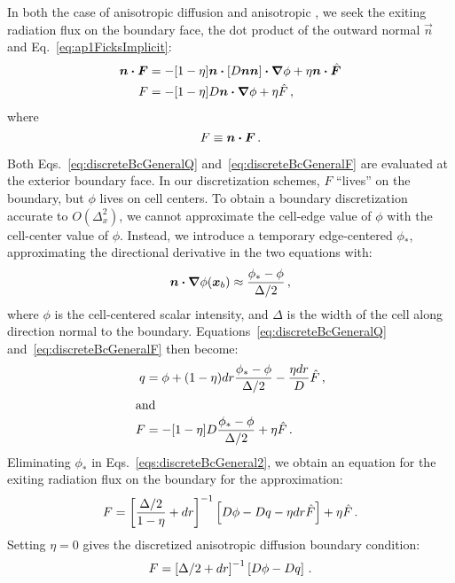 In both the case of anisotropic diffusion and anisotropic \Pone, we seek the
exiting radiation flux on the boundary face, the dot
product of the outward normal $\vec{n}$ and Eq.~\eqref{eq:ap1FicksImplicit}:
\begin{align}\nonumber
  \bm{n} \bm{\cdot}\bm{F}
  &= - [1 - \eta]\bm{n} \bm{\cdot} \left[ D \bm{n} \bm{n}  \right] \bm{\cdot} \bm{\nabla} \phi
  + \eta \bm{n} \bm{\cdot}\hat{\bm{F}}
  \\ \label{eq:discreteBcGeneralF}
  F &= - [1 - \eta] D \bm{n} \bm{\cdot} \bm{\nabla} \phi + \eta \hat{F} \,,
\end{align}
where
\begin{equation*}
  F \equiv \bm{n} \bm{\cdot} \bm{F} \,.
\end{equation*}

Both Eqs.~\eqref{eq:discreteBcGeneralQ} and~\eqref{eq:discreteBcGeneralF}
are evaluated at the exterior boundary face.  In our discretization schemes, 
$F$ ``lives'' on the boundary, but $\phi$ lives on cell centers. To obtain a
boundary discretization accurate to $O(\Delta_x^2)$, we cannot approximate the
cell-edge value of $\phi$ with the cell-center value of $\phi$. Instead, we
introduce a temporary edge-centered $\phi_*$, approximating the directional
derivative in the two equations with:
\begin{equation*}
  \bm{n} \bm{\cdot} \bm{\nabla} \phi(\bm{x}_b) \approx \frac{\phi_* - \phi}{\Delta/2}\,,
\end{equation*}
where $\phi$ is the cell-centered scalar intensity, and $\Delta$ is the width of
the cell along direction normal to the boundary. Equations~\eqref{eq:discreteBcGeneralQ}
and~\eqref{eq:discreteBcGeneralF} then become:
\begin{subequations}\label{eqs:discreteBcGeneral2}
  \begin{align}\label{eq:discreteBcGeneralQ2}
 q &=  \phi + (1 - \eta) dr \frac{\phi_* - \phi}{\Delta/2}
  - \frac{\eta dr}{D} \hat{F} \,,
  \\ 
  \intertext{and} \label{eq:discreteBcGeneralF2}
  F &= - [1 - \eta] D\frac{\phi_* - \phi}{\Delta/2} + \eta \hat{F} \,.
  \end{align}
\end{subequations}
Eliminating $\phi_*$ in Eqs.~\eqref{eqs:discreteBcGeneral2},
we obtain an equation for the exiting
radiation flux on the boundary for the \APone approximation:
\begin{equation}\label{eq:discreteBcAponeFinal}
  F = \left[ \frac{\Delta/2}{1 - \eta} + dr \right]^{-1}
  \left[ D\phi - Dq - \eta dr \hat{F} \right]
  + \eta \hat{F} \,.
\end{equation}
Setting $\eta=0$ gives the discretized anisotropic diffusion boundary condition:
\begin{equation}\label{eq:discreteBcAdFinal}
  F = \left[ \Delta/2 + dr \right]^{-1} \left[ D\phi - Dq  \right] \,.
\end{equation}

